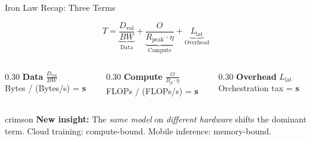 \documentclass[aspectratio=169, 12pt]{beamer}
\begin{document}
\begin{frame}{Iron Law Recap: Three Terms}
\note{
%
%
%
%
}

\footnotesize
$$T = \underbrace{\frac{D_{\text{vol}}}{BW}}_{\text{Data}} + \underbrace{\frac{O}{R_{\text{peak}} \cdot \eta}}_{\text{Compute}} + \underbrace{L_{\text{lat}}}_{\text{Overhead}}$$

\vspace{0.05cm}
\begin{columns}[T]
  \begin{column}{0.30\textwidth}
    \centering
    \textcolor{datastroke}{\textbf{Data}} $\frac{D_{\text{vol}}}{BW}$\\[0.05cm]
    {\scriptsize Bytes / (Bytes/s) = \textbf{s}}
  \end{column}
  \begin{column}{0.30\textwidth}
    \centering
    \textcolor{computestroke}{\textbf{Compute}} $\frac{O}{R_p \cdot \eta}$\\[0.05cm]
    {\scriptsize FLOPs / (FLOPs/s) = \textbf{s}}
  \end{column}
  \begin{column}{0.30\textwidth}
    \centering
    \textcolor{errorstroke}{\textbf{Overhead}} $L_{\text{lat}}$\\[0.05cm]
    {\scriptsize Orchestration tax = \textbf{s}}
  \end{column}
\end{columns}

\vspace{0.1cm}
\begin{mlsyscard}{crimson}
\textbf{New insight:} The \emph{same model} on \emph{different hardware} shifts the dominant term.
Cloud training: compute-bound. Mobile inference: memory-bound.
\end{mlsyscard}

\end{frame}
\end{document}
